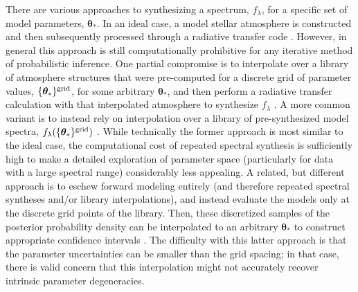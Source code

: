 \documentclass[iop,floatfix]{emulateapj}
\newcommand{\vt}{ {\bm \theta}}
\newcommand{\flam}{f_\lambda}
\newcommand{\vt}{ {\bm \theta}}
\newcommand{\fundamentalParameters}{\vt_{\ast}}
\newcommand{\gridParameters}{\{\fundamentalParameters\}^{\rm 
grid}}
\begin{document}
There are various approaches to synthesizing a spectrum, $f_{\lambda}$, for a specific set of model
parameters, $\vt_{\ast}$.  In an ideal case, a model stellar atmosphere is constructed and then 
subsequently processed through a radiative transfer code \citep[e.g.,][]{kurucz93,hauschildt99}.  
However, in general this approach is still computationally prohibitive for any iterative method of 
probabilistic inference.  One partial compromise is to interpolate over a library of atmosphere 
structures that were pre-computed for a discrete grid of parameter values, $\gridParameters$, for some arbitrary $\fundamentalParameters$, and then perform a radiative transfer calculation with 
that interpolated atmosphere to synthesize $\flam$ \citep[e.g., as for {\tt 
SME};][]{valenti96}.  A more common variant is to instead rely on interpolation over a library of 
pre-synthesized model spectra, $\flam(\gridParameters)$ \citep[e.g.,][]{castelli04,
allard12,husser13}.  While technically the former approach is most similar to the ideal case, the 
computational cost of repeated spectral synthesis is sufficiently high to make a detailed 
exploration of parameter space (particularly for data with a large spectral range) considerably 
less appealing.  A related, but different approach is to eschew forward modeling entirely (and 
therefore repeated spectral syntheses and/or library interpolations), and instead evaluate the 
models only at the discrete grid points of the library.  Then, these discretized samples of the 
posterior probability density can be interpolated to an arbitrary $\fundamentalParameters$ to construct 
appropriate confidence intervals \citep[similar to the method of {\tt SPC};][]{buchhave12}.  The 
difficulty with this latter approach is that the parameter uncertainties can be smaller than the 
grid spacing; in that case, there is valid concern that this interpolation might not accurately 
recover intrinsic parameter degeneracies.
\end{document}
